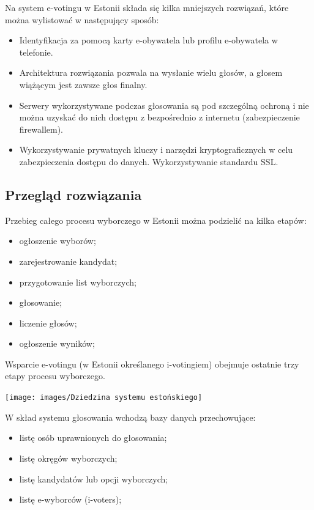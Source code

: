 \documentclass{report}
\begin{document}
Na system e-votingu  w Estonii składa się kilka mniejszych rozwiązań, które można wylistować w następujący sposób:
\begin{itemize}

    \item Identyfikacja za pomocą karty e-obywatela lub profilu e-obywatela w telefonie.

    \item Architektura rozwiązania pozwala na wysłanie wielu głosów, a głosem wiążącym jest zawsze głos finalny.

    \item Serwery wykorzystywane podczas głosowania są pod szczególną ochroną i nie można uzyskać do nich dostępu z bezpośrednio z internetu (zabezpieczenie firewallem).

    \item Wykorzystywanie prywatnych kluczy i narzędzi kryptograficznych w celu zabezpieczenia dostępu do danych. Wykorzystywanie standardu SSL.
    
\end{itemize}

\subsection{Przegląd rozwiązania}
Przebieg całego procesu wyborczego w Estonii można podzielić na kilka etapów:
\begin{itemize}
    \item ogłoszenie wyborów;
    \item zarejestrowanie kandydat;
    \item przygotowanie list wyborczych;
    \item głosowanie;
    \item liczenie głosów;
    \item ogłoszenie wyników;
\end{itemize}

Wsparcie e-votingu (w Estonii określanego i-votingiem) obejmuje ostatnie trzy etapy procesu wyborczego.

\texttt{[image: images/Dziedzina systemu estońskiego]}

W skład systemu głosowania wchodzą bazy danych przechowujące:
\begin{itemize}
    \item listę osób uprawnionych do głosowania;
    \item listę okręgów wyborczych;
    \item listę kandydatów lub opcji wyborczych;
    \item listę e-wyborców (i-voters);
\end{itemize}
\end{document}
